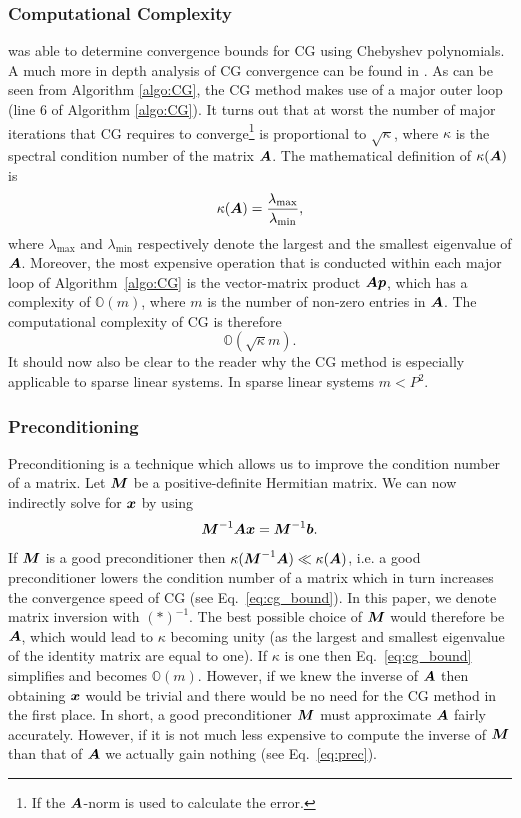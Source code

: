 \documentclass[useAMS,usenatbib]{mn2e}
\newcommand{\bA}{\bmath{A}}
\newcommand{\bM}{\bmath{M}}
\newcommand{\bb}{\bmath{b}}
\newcommand{\bx}{\bmath{x}}
\newcommand{\bp}{\bmath{p}}
\begin{document}
\subsubsection{Computational Complexity}
\citet{Kaniel1966} was able to determine convergence bounds for CG using Chebyshev polynomials. A much more in depth analysis of CG convergence can be found in
\citep{Sluis1986}. As can be seen from Algorithm \ref{algo:CG}, the CG method makes use of a major outer loop (line 6 of Algorithm \ref{algo:CG}). It turns out that at worst 
the number of major iterations that CG requires to converge\footnote{If the $\bA$-norm is used to calculate the error.} is proportional to $\sqrt{\kappa}$, where $\kappa$ is the spectral condition number of the matrix $\bA$.
The mathematical definition of $\kappa(\bA)$ is
\begin{equation}
\label{eq:kappa}
\kappa(\bA) = \frac{\lambda_{\textrm{max}}}{\lambda_{\textrm{min}}}, 
\end{equation}
where $\lambda_{\textrm{max}}$ and $\lambda_{\textrm{min}}$ respectively denote the largest and the smallest eigenvalue of $\bA$.
Moreover, the most expensive operation that is conducted within each major loop of Algorithm~\ref{algo:CG} is the vector-matrix product $\bA\bp$, which has a complexity of $\mathbb{O}(m)$, where $m$ is the number of non-zero entries in $\bA$.
The computational complexity of CG is therefore 
\begin{equation}
\label{eq:cg_bound}
\mathbb{O}(\sqrt{\kappa}m). 
\end{equation}
It should now also be clear to the reader why the CG method is especially applicable to sparse linear systems. In sparse linear systems $m < P^2$.

\subsubsection{Preconditioning}
\label{sec:precon}
Preconditioning is a technique which allows us to improve the condition number of a matrix. Let $\bM$ be a positive-definite Hermitian matrix.
We can now indirectly solve for $\bx$ by using 
\begin{equation}
\label{eq:prec}
\bM^{-1}\bA\bx = \bM^{-1}\bb.
\end{equation}
If $\bM$ is a good preconditioner then $\kappa(\bM^{-1}\bA) \ll \kappa(\bA)$, i.e. a good preconditioner lowers the condition number of a matrix which in turn increases the convergence speed 
of CG (see Eq.~\eqref{eq:cg_bound}). In this paper, we denote matrix inversion with $(*)^{-1}$. The best possible choice of $\bM$ would therefore be $\bA$, which would lead to $\kappa$ becoming unity (as the largest and smallest eigenvalue of the identity matrix are equal to one).
If $\kappa$ is one then Eq.~\eqref{eq:cg_bound} simplifies and becomes $\mathbb{O}(m)$. However, if we knew the inverse of $\bA$ then obtaining $\bx$ would be trivial and there would be no need for the CG method in the first place. 
In short, a good preconditioner $\bM$ must approximate $\bA$ fairly accurately. However, if it is not much less expensive to 
compute the inverse of $\bM$ than that of $\bA$ we actually gain nothing (see Eq.~\eqref{eq:prec}).  
\end{document}
